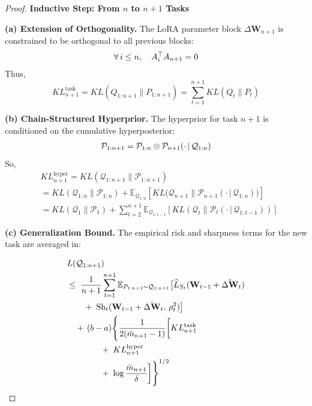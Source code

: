 \documentclass[letterpaper]{article} %
\begin{document}
\begin{proof}
\textbf{Inductive Step: From $n$ to $n+1$ Tasks}


\textbf{(a) Extension of Orthogonality.}
The LoRA parameter block $\Delta\mathbf{W}_{n+1}$ is constrained to be orthogonal to all previous blocks:
    \begin{align}
        \forall\, i \leq n, \quad A_i^\top A_{n+1} = 0 \notag
    \end{align}
    Thus,
    \begin{equation}
        KL^{\text{task}}_{n+1}=KL(Q_{1:n+1} \| P_{1:n+1}) = \sum_{t=1}^{n+1} KL(Q_t \| P_t)
    \end{equation}

\textbf{(b) Chain-Structured Hyperprior.}
    The hyperprior for task $n+1$ is conditioned on the cumulative hyperposterior:
    \begin{align}
        \mathcal{P}_{1:n+1} = \mathcal{P}_{1:n} \otimes \mathcal{P}_{n+1}(\cdot\,|\,\mathcal{Q}_{1:n}) \notag
    \end{align}
    So,
    \begin{equation}
        \begin{aligned}
        &KL^{\text{hyper}}_{n+1}
        =KL(\mathcal{Q}_{1:n+1} \| \mathcal{P}_{1:n+1}) \\
        &= KL(\mathcal{Q}_{1:n} \| \mathcal{P}_{1:n}) +\mathbb{E}_{\mathcal{Q}_{1:n}}\left[ KL\big(\mathcal{Q}_{n+1} \| \mathcal{P}_{n+1}(\cdot\,|\,\mathcal{Q}_{1:n})\big) \right] 
        \\
        &= KL(\mathcal{Q}_1 \| \mathcal{P}_1) +
         \sum_{t=2}^{n+1} \mathbb{E}_{\mathcal{Q}_{1:t-1}}\left[ KL\left(\mathcal{Q}_t \| \mathcal{P}_t(\cdot\,|\,\mathcal{Q}_{1:t-1})\right) \right]
    \end{aligned}
    \end{equation}


\textbf{(c) Generalization Bound.}
    The empirical risk and sharpness terms for the new task are averaged in:

\begin{align}
& L(\mathcal{Q}_{1:n+1})  \\
&\leq\; \frac{1}{n+1} \sum_{t=1}^{n+1}
    \mathbb{E}_{P_{1:n+1} \sim \mathcal{Q}_{1:n+1}}\big[
        \widehat{L}_{S_t}(\mathbf{W}_{t-1} + \hat{\Delta\mathbf{W}}_t) \notag \\
&\qquad
    +\; \mathrm{Sh}_t(\mathbf{W}_{t-1} + \hat{\Delta\mathbf{W}}_t,\, \rho_t^2)
    \big] \notag \\
&\quad
    +\, (b-a) \Bigg\{
        \frac{1}{2(\bar{m}_{n+1} - 1)} \bigg[
            KL_{n+1}^{\text{task}} \notag \\
&\qquad\qquad
            +\; KL_{n+1}^{\text{hyper}} \notag \\
&\qquad\qquad
            +\; \log\frac{\bar{m}_{n+1}}{\delta}
        \bigg]
    \Bigg\}^{1/2}
\end{align}


\end{proof}
\end{document}
